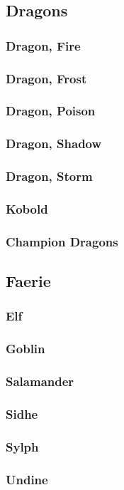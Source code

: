 \subsection{Dragons}
\begin{multicols}{2}
    \subsubsection*{Dragon, Fire}\label{foe:dragon-fire}
    \subsubsection*{Dragon, Frost}\label{foe:dragon-frost}
    \subsubsection*{Dragon, Poison}\label{foe:dragon-poison}
    \subsubsection*{Dragon, Shadow}\label{foe:dragon-shadow}
    \subsubsection*{Dragon, Storm}\label{foe:dragon-storm}
    \subsubsection*{Kobold}\label{foe:kobold}
\end{multicols}
\subsubsection{Champion Dragons}

\subsection{Faerie}
\begin{multicols}{2}
    \subsubsection*{Elf}\label{foe:elf}
    \subsubsection*{Goblin}\label{foe:goblin}
    \subsubsection*{Salamander}\label{foe:salamander}
    \subsubsection*{Sidhe}\label{foe:sidhe}
    \subsubsection*{Sylph}\label{foe:sylph}
    \subsubsection*{Undine}\label{foe:undine}
\end{multicols}
